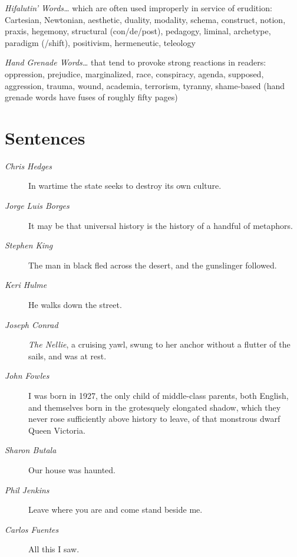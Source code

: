 \documentclass[letterpaper,oneside]{memoir}
\begin{document}
\begin{description}
\begin{description}
\item \textit{{Hifalutin' Words\ldots}} which are often used improperly in service of erudition: Cartesian, Newtonian, aesthetic, duality, modality, schema, construct, notion, praxis, hegemony, structural (con/de/post), pedagogy, liminal, archetype, paradigm (/shift), positivism, hermeneutic, teleology

\item \textit{{Hand Grenade Words\ldots}} that tend to provoke strong reactions in readers: oppression, prejudice, marginalized, race, conspiracy,  agenda, supposed, aggression, trauma, wound, academia, terrorism, tyranny, shame-based (hand grenade words have fuses of roughly fifty pages)

\end{description}
\newpage{}
\section{Sentences}
\begin{description}
\item [\textit{Chris Hedges}] In wartime the state seeks to destroy its own culture.
\item [\textit{Jorge Luis Borges}]
It may be that universal history is the history of a handful of metaphors.

\item [\textit{Stephen King}] The man in black fled across the desert, and the gunslinger followed.

\item [\textit{Keri Hulme}] He walks down the street.

\item [\textit{Joseph Conrad}] \textit{The Nellie}, a cruising yawl, swung to her anchor without a flutter of the sails, and was at rest.

\item [\textit{John Fowles}] I was born in 1927, the only child of middle-class parents, both English, and themselves born in the grotesquely elongated shadow, which they never rose sufficiently above history to leave, of that monstrous dwarf Queen Victoria.

\item [\textit{Sharon Butala}] Our house was haunted.

\item [\textit{Phil Jenkins}] Leave where you are and come stand beside me.

\item [\textit{Carlos Fuentes}] All this I saw.


\end{description}
\end{description}
\end{document}
